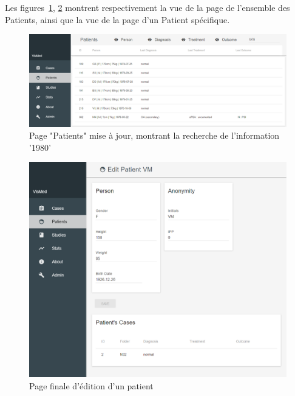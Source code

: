 	Les figures~\ref{patients1}, \ref{patients2} montrent respectivement la vue de la page de l'ensemble des Patients, ainsi que la vue de la page d'un Patient spécifique.

	\begin{figure}[!h]
		\centering
		\includegraphics[width=1\textwidth]{images/realisation/patients1}
		\caption{Page "Patients" mise à jour, montrant la recherche de l'information '1980'}
		\label{patients1}
	\end{figure}

	\begin{figure}[!h]
		\centering
		\includegraphics[width=1\textwidth]{images/realisation/patients2}
		\caption{Page finale d'édition d'un patient}
		\label{patients2}
	\end{figure}
